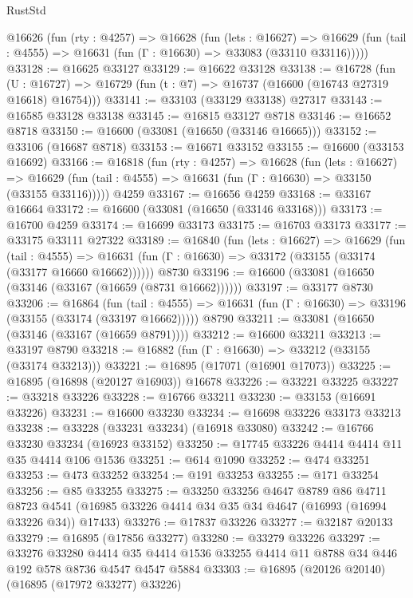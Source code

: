 \begin{lexlean}{RustStd}
\begin{coremodule}
{\begin{coremodule}
{{{{{{{{{{{{{{{{{{{{{{{{{{{{{{{{{{{{{{{{{{{{{{{{{{{{{{{  @16626
    (fun (rty : @4257) =>
    @16628
      (fun (lets : @16627) =>
      @16629 (fun (tail : @4555) => @16631 (fun (Γ : @16630) => @33083 (@33110 @33116)))))
@33128 := @16625 @33127
@33129 := @16622 @33128
@33138 := @16728
    (fun (U : @16727) => @16729 (fun (t : @7) => @16737 (@16600 (@16743 @27319 @16618) @16754)))
@33141 := @33103 (@33129 @33138) @27317
@33143 := @16585 @33128 @33138
@33145 := @16815 @33127 @8718
@33146 := @16652 @8718
@33150 := @16600 (@33081 (@16650 (@33146 @16665)))
@33152 := @33106 (@16687 @8718)
@33153 := @16671 @33152
@33155 := @16600 (@33153 @16692)
@33166 := @16818
    (fun (rty : @4257) =>
    @16628
      (fun (lets : @16627) =>
      @16629 (fun (tail : @4555) => @16631 (fun (Γ : @16630) => @33150 (@33155 @33116)))))
    @4259
@33167 := @16656 @4259
@33168 := @33167 @16664
@33172 := @16600 (@33081 (@16650 (@33146 @33168)))
@33173 := @16700 @4259
@33174 := @16699 @33173
@33175 := @16703 @33173
@33177 := @33175 @33111 @27322
@33189 := @16840
    (fun (lets : @16627) =>
    @16629
      (fun (tail : @4555) =>
      @16631 (fun (Γ : @16630) => @33172 (@33155 (@33174 (@33177 @16660 @16662))))))
    @8730
@33196 := @16600 (@33081 (@16650 (@33146 (@33167 (@16659 (@8731 @16662))))))
@33197 := @33177 @8730
@33206 := @16864
    (fun (tail : @4555) => @16631 (fun (Γ : @16630) => @33196 (@33155 (@33174 (@33197 @16662)))))
    @8790
@33211 := @33081 (@16650 (@33146 (@33167 (@16659 @8791))))
@33212 := @16600 @33211
@33213 := @33197 @8790
@33218 := @16882 (fun (Γ : @16630) => @33212 (@33155 (@33174 @33213)))
@33221 := @16895 (@17071 (@16901 @17073))
@33225 := @16895 (@16898 (@20127 @16903)) @16678
@33226 := @33221 @33225
@33227 := @33218 @33226
@33228 := @16766 @33211
@33230 := @33153 (@16691 @33226)
@33231 := @16600 @33230
@33234 := @16698 @33226 @33173 @33213
@33238 := @33228 (@33231 @33234) (@16918 @33080)
@33242 := @16766 @33230 @33234 (@16923 @33152)
@33250 := @17745 @33226 @4414 @4414 @11 @35 @4414 @106 @1536
@33251 := @614 @1090
@33252 := @474 @33251
@33253 := @473 @33252
@33254 := @191 @33253
@33255 := @171 @33254
@33256 := @85 @33255
@33275 := @33250
    @33256
    @4647
    @8789
    @86
    @4711
    @8723
    @4541
    (@16985 @33226 @4414 @34 @35 @34 @4647 (@16993 (@16994 @33226 @34)) @17433)
@33276 := @17837 @33226
@33277 := @32187 @20133
@33279 := @16895 (@17856 @33277)
@33280 := @33279 @33226
@33297 := @33276
    @33280
    @4414
    @35
    @4414
    @1536
    @33255
    @4414
    @11
    @8788
    @34
    @446
    @192
    @578
    @8736
    @4547
    @4547
    @5884
@33303 := @16895 (@20126 @20140) (@16895 (@17972 @33277) @33226)
}}}}}}}}}}}}}}}}}}}}}}}}}}}}}}}}}}}}}}}}}}}}}}}}}}}}}}}
\end{coremodule}}
\end{coremodule}
\end{lexlean}
